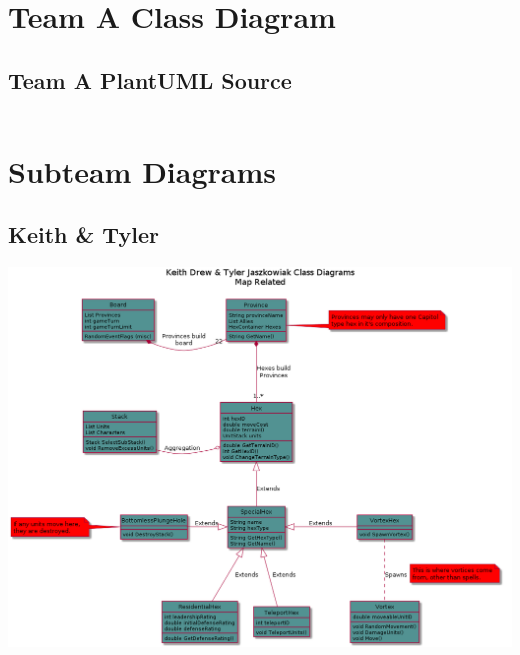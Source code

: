\documentclass[10pt,a4paper]{article}
\begin{document}
\pagebreak
\section{Team A Class Diagram}

\subsection{Team A PlantUML Source}
\begin{verbatim}

\end{verbatim}

\section{Subteam Diagrams}
\subsection{Keith & Tyler}
\includegraphics[width=\textwidth]{classD}
\end{document}
